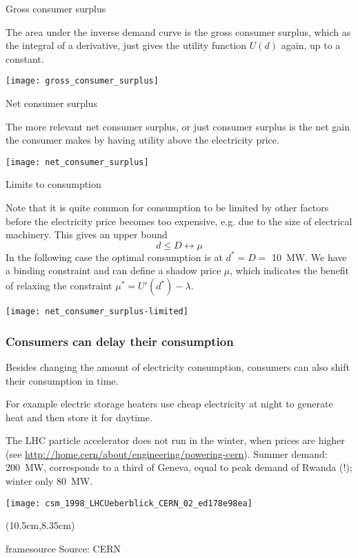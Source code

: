 \documentclass[10pt,aspectratio=169,dvipsnames]{beamer}
\def\l{\lambda}
\def\m{\mu}
\newcommand{\source}[1]{\begin{textblock*}{5cm}(10.5cm,8.35cm)
    \begin{beamercolorbox}[ht=0.5cm,right]{framesource}
        \usebeamerfont{framesource}\usebeamercolor[fg]{framesource} Source: {#1}
    \end{beamercolorbox}
\end{textblock*}}
\begin{document}
\begin{frame}{Gross consumer surplus}

  The area under the inverse demand curve is the \alert{gross consumer surplus},
  which as the integral of a derivative, just gives the utility
  function $U(d)$ again, up to a constant.

  \centering
  \texttt{[image: gross\_consumer\_surplus]}

\end{frame}



\begin{frame}{Net consumer surplus}

  The more relevant \alert{net consumer surplus}, or just
  \alert{consumer surplus} is the net gain the consumer makes by
  having utility above the electricity price.

  \centering
  \texttt{[image: net\_consumer\_surplus]}

\end{frame}


\begin{frame}{Limits to consumption}


  Note that it is quite common for consumption to be limited by other
  factors before the electricity price becomes too expensive, e.g. due
  to the size of electrical machinery. This gives an upper bound
  \begin{equation*}
    d \leq D  \leftrightarrow \m
  \end{equation*}
  In the following case the optimal consumption is at
  $d^* = D =$  10~MW. We have a \alert{binding} constraint and can define a \alert{shadow price} $\m$, which indicates the benefit of relaxing the constraint $\m^* = U'(d^*) - \l$.

  \centering
  \texttt{[image: net\_consumer\_surplus-limited]}

\end{frame}



\begin{frame}
  \frametitle{Consumers can delay their consumption}

  Besides changing the amount of electricity consumption, consumers
  can also shift their consumption in time.

  For example electric storage heaters use cheap electricity at night
  to generate heat and then store it for daytime.

  The LHC particle accelerator does not run in the winter,
  when prices are higher (see
  \url{http://home.cern/about/engineering/powering-cern}).  Summer
  demand: 200~MW, corresponds to a third of Geneva, equal to peak
  demand of Rwanda (!); winter only 80~MW.


  \centering
  \texttt{[image: csm\_1998\_LHCUeberblick\_CERN\_02\_ed178e98ea]}


  \source{CERN}



\end{frame}
\end{document}

